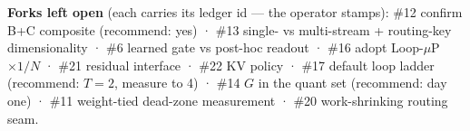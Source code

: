 \textbf{Forks left open} (each carries its ledger id --- the operator stamps): \#12 confirm
B+C composite (recommend: yes) · \#13 single- vs multi-stream + routing-key dimensionality ·
\#6 learned gate vs post-hoc readout · \#16 adopt Loop-$\mu$P $\times1/N$ · \#21 residual
interface · \#22 KV policy · \#17 default loop ladder (recommend: $T=2$, measure to 4) · \#14
$G$ in the quant set (recommend: day one) · \#11 weight-tied dead-zone measurement · \#20
work-shrinking routing seam.
